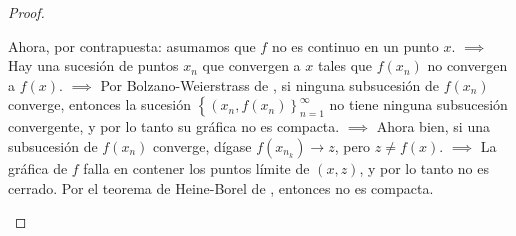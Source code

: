 \begin{proof}
\begin{itemize}
    Ahora, por contrapuesta: asumamos que $f$ no es continuo en un punto  $x$. $\implies$ Hay una sucesión de puntos $x_{n}$ que convergen a $x$ tales que $f\left(x_{n}\right)$ no convergen a $f(x)$. $\implies$ Por Bolzano-Weierstrass de \cite{abbott2012understanding}, si ninguna subsucesión de $f\left(x_{n}\right)$ converge, entonces la sucesión $\left\{\left(x_{n}, f\left(x_{n}\right)\right\}_{n=1}^{\infty}\right.$ no tiene ninguna subsucesión convergente, y por lo tanto su gráfica no es compacta. $\implies$ Ahora bien, si una subsucesión de $f\left(x_{n}\right)$ converge, dígase $f\left(x_{n_{k}}\right) \rightarrow z$, pero $z \neq f(x)$. $\implies$ La gráfica de $f$ falla en contener los puntos límite de $(x, z)$, y por lo tanto no es cerrado. Por el teorema de Heine-Borel de \cite{abbott2012understanding}, entonces no es compacta. 
    
\end{itemize}
\end{proof}